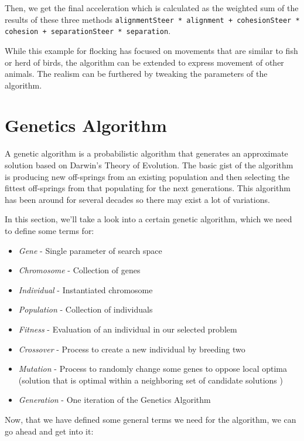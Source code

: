 \documentclass[a4paper, 12pt]{book}
\begin{document}
Then, we get the final acceleration which is calculated as the weighted sum of the results of these three methods \texttt{alignmentSteer * alignment + cohesionSteer * cohesion + separationSteer * separation}.

While this example for flocking \cite{FlocksReynolds} has focused on movements that are similar to fish or herd of birds, the algorithm can be extended to express movement of other animals. The realism can be furthered by tweaking the parameters of the algorithm.

\section{Genetics Algorithm}

A genetic algorithm \cite{GameAIGeneticAlg} is a probabilistic algorithm that generates an approximate solution based on Darwin’s Theory of Evolution. The basic gist of the algorithm is producing new off-springs from an existing population and then selecting the fittest off-springs from that populating for the next generations. This algorithm has been around for several decades so there may exist a lot of variations.

In this section, we'll take a look into a certain genetic algorithm, which we need to define some terms for:

\begin{itemize}
    \item \emph{Gene} - Single parameter of search space
    \item \emph{Chromosome} - Collection of genes
    \item \emph{Individual} - Instantiated chromosome
    \item \emph{Population} - Collection of individuals
    \item \emph{Fitness} - Evaluation of an individual in our selected problem
    \item \emph{Crossover} - Process to create a new individual by breeding two
    \item \emph{Mutation} - Process to randomly change some genes to oppose local optima (solution that is optimal within a neighboring set of candidate solutions \cite{LocalOptimum}) 
    \item \emph{Generation} - One iteration of the Genetics Algorithm
\end{itemize}

Now, that we have defined some general terms we need for the algorithm, we can go ahead and get into it:
\end{document}
